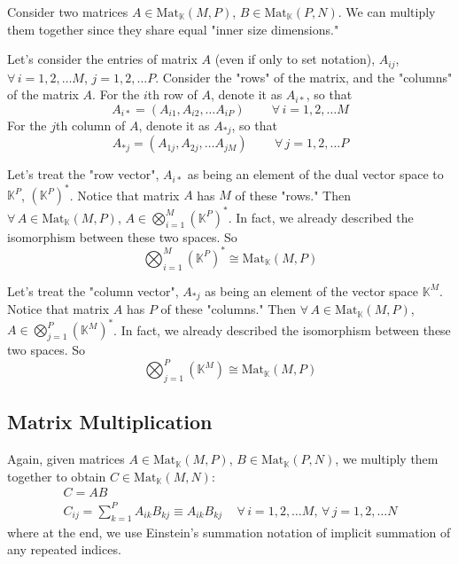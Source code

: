 \documentclass[10pt]{amsart}
\begin{document}
Consider two matrices $A \in \text{Mat}_{\mathbb{K}}(M,P)$, $B \in \text{Mat}_{\mathbb{K}}(P,N)$.  We can multiply them together since they share equal "inner size dimensions." 

Let's consider the entries of matrix $A$ (even if only to set notation), $A_{ij}$, \, $\forall \, i = 1,2, \dots M$, $j=1,2,\dots P$.  Consider the "rows" of the matrix, and the "columns" of the matrix $A$.  For the $i$th row of $A$, denote it as $A_{i*}$, so that 
\begin{equation}\label{Eq:RowForm}
	A_{i*} = (A_{i1},A_{i2}, \dots A_{iP}) \qquad \, \forall \, i = 1,2, \dots M	
\end{equation}
For the $j$th column of $A$, denote it as $A_{*j}$, so that 
\begin{equation}\label{Eq:ColumnForm}
	A_{*j} = (A_{1j},A_{2j}, \dots A_{jM}) \qquad \, \forall \, j = 1,2, \dots P 
\end{equation}

Let's treat the "row vector", $A_{i*}$ as being an element of the dual vector space to $\mathbb{K}^P$, $(\mathbb{K}^P)^*$.  Notice that matrix $A$ has $M$ of these "rows."  Then $\forall \, A \in \text{Mat}_{\mathbb{K}}(M,P)$, $A \in \bigotimes_{i=1}^M (\mathbb{K}^P)^*$.  In fact, we already described the isomorphism between these two spaces.  So 
\begin{equation}
\bigotimes_{i=1}^M (\mathbb{K}^P)^* \cong \text{Mat}_{\mathbb{K}}(M,P)
\end{equation}

Let's treat the "column vector", $A_{*j}$ as being an element of the vector space $\mathbb{K}^M$.  Notice that matrix $A$ has $P$ of these "columns."  Then $\forall \, A \in \text{Mat}_{\mathbb{K}}(M,P)$, $A \in \bigotimes_{j=1}^P (\mathbb{K}^M)^*$.  In fact, we already described the isomorphism between these two spaces.  So 
\begin{equation}
\bigotimes_{j=1}^P (\mathbb{K}^M) \cong \text{Mat}_{\mathbb{K}}(M,P)
\end{equation}

\subsection{Matrix Multiplication}

Again, given matrices $A \in \text{Mat}_{\mathbb{K}}(M,P)$, $B \in \text{Mat}_{\mathbb{K}}(P,N)$, we multiply them together to obtain $C \in \text{Mat}_{\mathbb{K}}(M,N)$: 
\begin{equation}
\begin{gathered}
C = AB  \\
C_{ij} = \sum_{k=1}^P A_{ik}B_{kj} \equiv A_{ik}B_{kj} \quad \, \forall \, i=1,2,\dots M, \, \forall \, j = 1,2, \dots N 
\end{gathered}
\end{equation}
where at the end, we use Einstein's summation notation of implicit summation of any repeated indices.  
\end{document}

